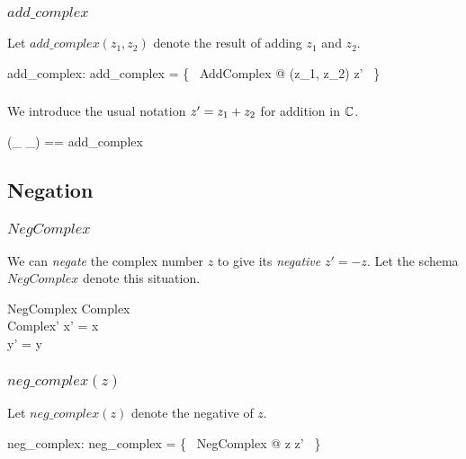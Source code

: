 \documentclass{amsart}
\begin{document}
\subsubsection{$add\_complex$}

Let $add\_complex(z_1, z_2)$ denote the result of adding $z_1$ and $z_2$.

\begin{axdef}
	add\_complex: \C \cross \C \fun \C
\where
	add\_complex = \{~ AddComplex @ (z_1, z_2) \mapsto z' ~\}
\end{axdef}

\subsubsection{}

We introduce the usual notation $z' = z_1 \mathbin{+} z_2$ for addition in $\mathbb{C}$.

\begin{zed}
	(\_ \addC \_) == add\_complex
\end{zed}

\subsection{Negation}

\subsubsection{$NegComplex$}

We can \textit{negate} the complex number $z$ to give its \textit{negative} $z' = -z$.
Let the schema $NegComplex$ denote this situation.

\begin{schema}{NegComplex}
	Complex \\
	Complex'
\where
	x' = \negR x \\
	y' = \negR y
\end{schema}

\subsubsection{$neg\_complex(z)$}

Let $neg\_complex(z)$ denote the negative of $z$.

\begin{axdef}
	neg\_complex: \C \fun \C
\where
	neg\_complex = \{~ NegComplex @ z \mapsto z' ~\}
\end{axdef}
\end{document}
